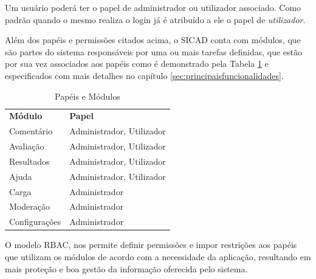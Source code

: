 \documentclass[12pt, a4paper]{report}
\begin{document}
Um usuário poderá ter o papel de administrador ou utilizador associado. Como padrão quando o mesmo realiza o login já é atribuído a ele o papel de \textit{utilizador}.

Além dos papéis e permissões citados acima, o \ac{SICAD} conta com módulos, que são partes do sistema responsáveis por uma ou mais tarefas definidas, que estão por sua vez associados aos papéis como é demonstrado pela Tabela \ref{tab:papelmod} e especificados com mais detalhes no capítulo \ref{sec:principaisfuncionalidades}.

\begin{table}
 \centering
 {\renewcommand\arraystretch{1.25}
 
 \begin{tabular}{ l l }
  \cline{1-1}\cline{2-2}  
    \multicolumn{1}{|p{3.850cm}|}{\textbf{Módulo} \centering } &
    \multicolumn{1}{p{7.217cm}|}{\textbf{Papel} \centering }
  \\  
  \cline{1-1}\cline{2-2}  
    \multicolumn{1}{|p{3.850cm}|}{Comentário} &
    \multicolumn{1}{p{6.217cm}|}{Administrador, Utilizador}
  \\  
  \cline{1-1}\cline{2-2}  
    \multicolumn{1}{|p{3.850cm}|}{Avaliação} &
    \multicolumn{1}{p{6.217cm}|}{Administrador, Utilizador}
  \\  
    \cline{1-1}\cline{2-2}  
    \multicolumn{1}{|p{3.850cm}|}{Resultados} &
    \multicolumn{1}{p{6.217cm}|}{Administrador, Utilizador}
  \\  
    \cline{1-1}\cline{2-2}  
    \multicolumn{1}{|p{3.850cm}|}{Ajuda} &
    \multicolumn{1}{p{6.217cm}|}{Administrador, Utilizador}
  \\  
    \cline{1-1}\cline{2-2}  
    \multicolumn{1}{|p{3.850cm}|}{Carga} &
    \multicolumn{1}{p{6.217cm}|}{Administrador}
  \\  
    \cline{1-1}\cline{2-2}  
    \multicolumn{1}{|p{3.850cm}|}{Moderação} &
    \multicolumn{1}{p{6.217cm}|}{Administrador}
  \\  
    \cline{1-1}\cline{2-2}  
    \multicolumn{1}{|p{3.850cm}|}{Configurações} &
    \multicolumn{1}{p{6.217cm}|}{Administrador}
  \\  
  \hline
 \end{tabular}}
 \caption{Papéis e Módulos}
 \label{tab:papelmod}
\end{table}
O modelo \ac{RBAC}, nos permite  definir permissões e impor restrições aos papéis que utilizam os módulos de acordo com a necessidade da aplicação, resultando em mais proteção e boa gestão da informação oferecida pelo sistema.
\end{document}
